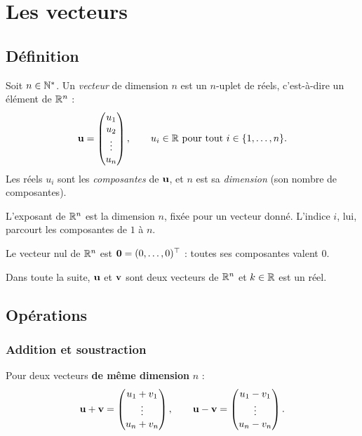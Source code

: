 
\chapter{Les vecteurs}
\label{chap-vecteurs}

\section{Définition}

\begin{definition}[Vecteur]
Soit $n \in \mathbb{N}^*$. Un \emph{vecteur} de dimension $n$
est un $n$-uplet de réels, c'est-à-dire un élément
de $\mathbb{R}^n$ :
\[
    \mathbf{u} = \begin{pmatrix} u_1 \\ u_2 \\ \vdots \\ u_n \end{pmatrix},
    \qquad u_i \in \mathbb{R} \text{ pour tout } i \in \{1, \dots, n\}.
\]
Les réels $u_i$ sont les \emph{composantes} de
$\mathbf{u}$, et $n$ est sa \emph{dimension}
(son nombre de composantes).
\end{definition}

\begin{remark}
L'exposant de $\mathbb{R}^n$ est la dimension $n$, fixée
pour un vecteur donné. L'indice $i$, lui, parcourt
les composantes de $1$ à $n$.
\end{remark}

\begin{definition}
Le vecteur nul de $\mathbb{R}^n$ est
$\mathbf{0} = (0, \dots, 0)^\top$ : toutes ses
composantes valent $0$.
\end{definition}

Dans toute la suite, $\mathbf{u}$ et $\mathbf{v}$ sont
deux vecteurs de $\mathbb{R}^n$ et $k \in \mathbb{R}$ est un réel.

\section{Opérations}

\subsection{Addition et soustraction}

\begin{definition}
Pour deux vecteurs \textbf{de même dimension} $n$ :
\[
    \mathbf{u} + \mathbf{v} =
    \begin{pmatrix} u_1 + v_1 \\ \vdots \\ u_n + v_n \end{pmatrix},
    \qquad
    \mathbf{u} - \mathbf{v} =
    \begin{pmatrix} u_1 - v_1 \\ \vdots \\ u_n - v_n \end{pmatrix}.
\]
\end{definition}

